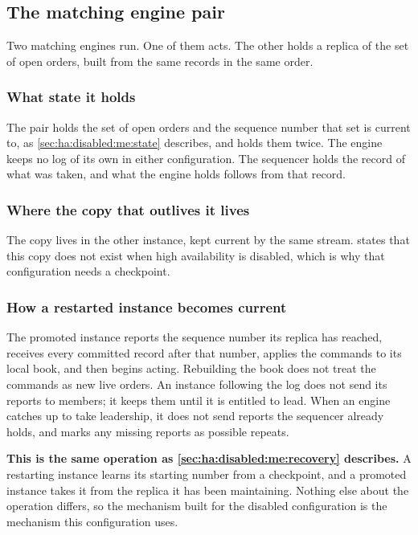\subsection{The matching engine pair}
\label{sec:ha:enabled:me}

Two matching engines run. One of them acts. The other holds a replica of the set
of open orders, built from the same records in the same order.

\subsubsection{What state it holds}
\label{sec:ha:enabled:me:state}

The pair holds the set of open orders and the sequence number that set is current
to, as \cref{sec:ha:disabled:me:state} describes, and holds them twice. The
engine keeps no log of its own in either configuration. The sequencer holds the
record of what was taken, and what the engine holds follows from that record.

\subsubsection{Where the copy that outlives it lives}
\label{sec:ha:enabled:me:durable}

The copy lives in the other instance, kept current by the same stream.
 states that this copy does not exist when high
availability is disabled, which is why that configuration needs a checkpoint.

\subsubsection{How a restarted instance becomes current}
\label{sec:ha:enabled:me:recovery}

The promoted instance reports the sequence number its replica has reached,
receives every committed record after that number, applies the commands to its
local book, and then begins acting. Rebuilding the book does not treat the
commands as new live orders. An instance following the log does not send its
reports to members; it keeps them until it is entitled to lead. When an engine
catches up to take leadership, it does not send reports the sequencer already
holds, and marks any missing reports as possible repeats.

\textbf{This is the same operation as \cref{sec:ha:disabled:me:recovery}
describes.} A restarting instance learns its starting number from a checkpoint,
and a promoted instance takes it from the replica it has been maintaining.
Nothing else about the operation differs, so the mechanism built for the disabled
configuration is the mechanism this configuration uses.


